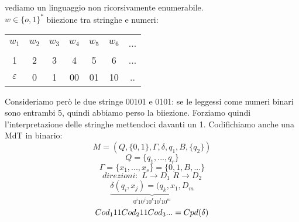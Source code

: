 	\begin{example}
		vediamo un linguaggio non ricorsivamente enumerabile.\\
		$w\in\{o,1\}^*$ biiezione tra stringhe e numeri:
		\begin{center}
			\begin{tabular}{c c c c c c c}
				$w_1$         & $w_2$ & $w_3$ & $w_4$ & $w_5$ & $w_6$ & ... \\
				1             & 2     & 3     & 4     & 5     & 6     & ... \\
				$\varepsilon$ & 0     & 1     & 00    & 01    & 10    & ..
			\end{tabular}
		\end{center}
		Consideriamo però le due stringe 00101 e 0101: se le leggessi come numeri binari sono entrambi
		5, quindi abbiamo perso la biiezione.
		Forziamo quindi l'interpretazione delle stringhe mettendoci davanti un 1.
		Codifichiamo anche una MdT in binario:
		$$M=(Q,\{0,1\},\Gamma,\delta,q_1,B,\{q_2\})$$
		$$Q=\{q_1,...,q_r\}$$
		$$\Gamma=\{x_1,...,x_s\}=\{0,1,B,...\}$$
		$$direzioni:\,\,L\to D_1\,\,R\to D_2$$
		$$\underbrace{\delta(q_i,x_j)=(q_k,x_1,D_m}_{0^i10^j10^k10^l10^m}$$
		$$Cod_111Cod_211Cod_3\\...=Cpd(\delta)$$
	\end{example}
